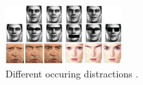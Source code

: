 \begin{figure}[ht]
	\centering		
	\includegraphics[width = 0.4\textwidth]{rsrc/faces.png}
	\caption{Different occuring distractions \cite{Occlusion&noise}.}
	\label{fig:Distractions}
\end{figure}
